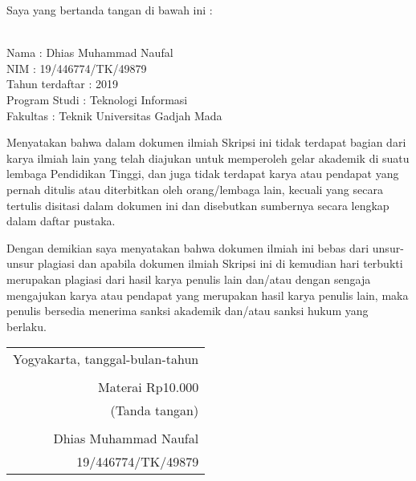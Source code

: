 \noindent Saya yang bertanda tangan di bawah ini :

\vspace{-1em}

\begin{tabbing}
\hspace{40mm} \= \\ %
\noindent Nama \> : Dhias Muhammad Naufal\\[\parskip]
\noindent NIM \> :  19/446774/TK/49879\\[\parskip]
\noindent Tahun terdaftar \> : 2019 \\[\parskip]
\noindent Program Studi \> : Teknologi Informasi\\[\parskip]
\noindent Fakultas \> : Teknik Universitas Gadjah Mada
\end{tabbing}

\noindent Menyatakan bahwa dalam dokumen ilmiah Skripsi ini tidak terdapat bagian dari karya ilmiah lain yang telah diajukan untuk memperoleh gelar akademik di suatu lembaga Pendidikan Tinggi, dan juga tidak terdapat karya atau pendapat yang pernah ditulis atau diterbitkan oleh orang/lembaga lain, kecuali yang secara tertulis disitasi dalam dokumen ini dan disebutkan sumbernya secara lengkap dalam daftar pustaka.

\noindent Dengan demikian saya menyatakan bahwa dokumen ilmiah ini bebas dari unsur-unsur plagiasi dan apabila dokumen ilmiah Skripsi ini di kemudian hari terbukti merupakan plagiasi dari hasil karya penulis lain dan/atau dengan sengaja mengajukan karya atau pendapat yang merupakan hasil karya penulis lain, maka penulis bersedia menerima sanksi akademik dan/atau sanksi hukum yang berlaku.


\begin{flushright}
	\begin{tabular}{r}
		Yogyakarta, tanggal-bulan-tahun \\
		\vspace{0.1cm} \\
		\tiny{Materai Rp10.000} \\
		\tiny{(Tanda tangan)} \\	
		\vspace{0.1cm} \\
		Dhias Muhammad Naufal \\ 19/446774/TK/49879
	\end{tabular}
\end{flushright}